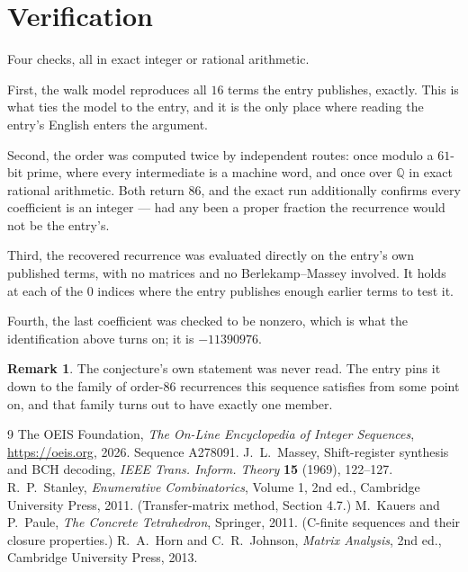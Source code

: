 \documentclass[11pt,a4paper]{article}
\theoremstyle{plain}
\theoremstyle{definition}
\newtheorem{remark}[theorem]{Remark}
\begin{document}
\section{Verification}

Four checks, all in exact integer or rational arithmetic.

First, the walk model reproduces all $16$ terms the entry publishes, exactly. This is
what ties the model to the entry, and it is the only place where reading the entry's English
enters the argument.

Second, the order was computed twice by independent routes: once modulo a $61$-bit prime, where
every intermediate is a machine word, and once over $\mathbb{Q}$ in exact rational arithmetic.
Both return $86$, and the exact run additionally confirms every coefficient is an integer
--- had any been a proper fraction the recurrence would not be the entry's.

Third, the recovered recurrence was evaluated directly on the entry's own published terms, with
no matrices and no Berlekamp--Massey involved. It holds at each of the $0$ indices where
the entry publishes enough earlier terms to test it.

Fourth, the last coefficient was checked to be nonzero, which is what the identification above
turns on; it is $-11390976$.

\begin{remark}
The conjecture's own statement was never read. The entry pins it down to the family of
order-$86$ recurrences this sequence satisfies from some point on, and that family turns
out to have exactly one member.
\end{remark}

\begin{thebibliography}{9}
 The OEIS Foundation, \emph{The On-Line Encyclopedia of Integer
Sequences}, \url{https://oeis.org}, 2026. Sequence A278091.
 J.~L.~Massey, Shift-register synthesis and BCH decoding, \emph{IEEE
Trans. Inform. Theory} \textbf{15} (1969), 122--127.
 R.~P.~Stanley, \emph{Enumerative Combinatorics}, Volume 1, 2nd ed.,
Cambridge University Press, 2011. (Transfer-matrix method, Section 4.7.)
 M.~Kauers and P.~Paule, \emph{The Concrete Tetrahedron}, Springer, 2011.
(C-finite sequences and their closure properties.)
 R.~A.~Horn and C.~R.~Johnson, \emph{Matrix Analysis}, 2nd ed., Cambridge
University Press, 2013.
\end{thebibliography}
\end{document}
